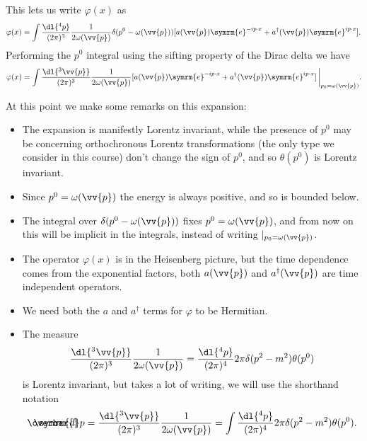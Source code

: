 \documentclass[fleqn]{NotesClass}
\newcommand{\e}{\symrm{e}}
\newcommand{\hermit}{{\dagger}}
\newcommand{\dbar}[1][0.0]{\ThisStyle{\ensurestackMath{%
            \stackengine{#1\LMex}{\SavedStyle \symrm{d}}{\SavedStyle\overbar{}%
                \mkern2.25mu}{O}{r}{F}{F}{L}}}}
\newcommand{\invariantmeasure}[1]{%
    \mathchoice{\dbar #1}{\dbar #1}{\dbar[.05] #1}{\dbar[.06] #1}
}
\newcommand{\heaviside}{\theta}
\begin{document}
    This lets us write \(\varphi(x)\) as
    \begin{equation}
        \varphi(x) = \int \frac{\dl{^4 p}}{(2\pi)^3} \frac{1}{2\omega(\vv{p})} \delta(p^0 - \omega(\vv{p})) [ a(\vv{p}) \e^{-ip\cdot x} + a^\hermit(\vv{p}) \e^{i p \cdot x} ].
    \end{equation}
    Performing the \(p^0\) integral using the sifting property of the Dirac delta we have
    \begin{equation}
        \varphi(x) = \int \frac{\dl{^3\vv{p}}}{(2\pi)^3} \frac{1}{2\omega(\vv{p})} [ a(\vv{p}) \e^{-ip\cdot x} + a^\hermit(\vv{p}) \e^{i p \cdot x} ] \, \bigg|_{p_0 = \omega(\vv{p})}.
    \end{equation}
    
    At this point we make some remarks on this expansion:
    \begin{itemize}
        \item The expansion is manifestly Lorentz invariant, while the presence of \(p^0\) may be concerning orthochronous Lorentz transformations (the only type we consider in this course) don't change the sign of \(p^0\), and so \(\heaviside(p^0)\) is Lorentz invariant.
        \item Since \(p^0 = \omega(\vv{p})\) the energy is always positive, and so is bounded below.
        \item The integral over \(\delta(p^0 - \omega(\vv{p}))\) fixes \(p^0 = \omega(\vv{p})\), and from now on this will be implicit in the integrals, instead of writing \(|_{p_0 = \omega(\vv{p})}\).
        \item The operator \(\varphi(x)\) is in the Heisenberg picture, but the time dependence comes from the exponential factors, both \(a(\vv{p})\) and \(a^\hermit(\vv{p})\) are time independent operators.
        \item We need both the \(a\) and \(a^\hermit\) terms for \(\varphi\) to be Hermitian.
        \item The measure
        \begin{equation}
            \frac{\dl{^3\vv{p}}}{(2\pi)^3} \frac{1}{2\omega(\vv{p})} = \frac{\dl{^4p}}{(2\pi)^4} 2\pi \delta(p^2 - m^2) \heaviside(p^0)
        \end{equation}
        is Lorentz invariant, but takes a lot of writing, we will use the shorthand notation
        \begin{equation}
            \invariantmeasure{p} = \frac{\dl{^3\vv{p}}}{(2\pi)^3} \frac{1}{2\omega(\vv{p})} = \int \frac{\dl{^4p}}{(2\pi)^4} 2\pi \delta(p^2 - m^2) \heaviside(p^0).
        \end{equation}
    \end{itemize}
    
\end{document}
